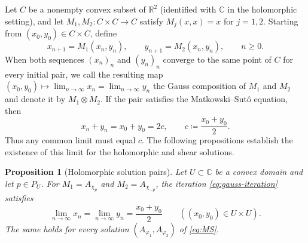 \documentclass[a4paper, reqno, 11pt]{amsart}
\newtheorem{Prop}[Thm]{Proposition}
\theoremstyle{definition}
\begin{document}
Let $C$ be a nonempty convex subset of $\mathbb R^2$ (identified with
$\mathbb C$ in the holomorphic setting), and let $M_1,M_2:C\times C\to C$ satisfy
$M_j(x,x) = x$ for $j=1,2$. Starting from $(x_0,y_0)\in C\times C$, define
\begin{equation}\label{eq:gauss-iteration}
  x_{n+1}=M_1(x_n,y_n),\qquad  y_{n+1}=M_2(x_n,y_n),\qquad n\ge 0.
\end{equation}
When both sequences $(x_n)_n$ and $(y_n)_n$ converge to the same point of $C$ for every initial pair,
we call the resulting map $(x_0,y_0) \mapsto \lim_{n\to\infty} x_n = \lim_{n \to \infty} y_n$
the Gauss composition of $M_1$ and $M_2$ and denote it by $M_1\otimes M_2$.
If the pair satisfies the Matkowski--Sut\^o equation, then
\begin{equation}\label{eq:gauss-center}
  x_n+y_n=x_0+y_0=2c,\qquad
  c\coloneqq\frac{x_0+y_0}{2}.
\end{equation}
Thus any common limit must equal $c$. The following propositions establish
the existence of this limit for the holomorphic and shear solutions.


\begin{Prop}[Holomorphic solution pairs]\label{prop:gauss-holomorphic}
Let $U\subset\mathbb C$ be a convex domain and let $p\in P_U$.
For $M_1=A_{\chi_p}$ and $M_2=A_{\chi_{-p}}$, the iteration \eqref{eq:gauss-iteration} satisfies
\begin{equation*}
  \lim_{n\to\infty} x_n = \lim_{n\to\infty} y_n  =\frac{x_0+y_0}{2}  \qquad ((x_0,y_0)\in U\times U).
\end{equation*}
The same holds for every solution $(A_{\varphi_1}, A_{\varphi_2})$ of \eqref{eq:MS}.
\end{Prop}
\end{document}
